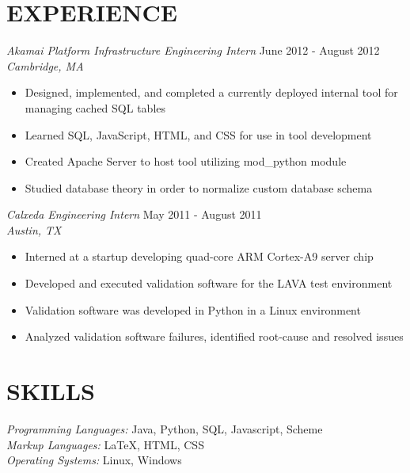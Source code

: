 \documentclass[margin]{res}
\begin{document}
\begin{resume}
                

\section{EXPERIENCE} {\sl Akamai Platform Infrastructure Engineering Intern} \hfill June 2012 -  August 2012 \\
                    {\sl Cambridge, MA}
                 \begin{itemize}  \itemsep -2pt %
                         \item  Designed, implemented, and completed a currently deployed internal tool for managing cached SQL tables
                         \item Learned SQL, JavaScript, HTML, and CSS for use in tool development
                         \item Created Apache Server to host tool utilizing mod\_python module 
                         \item Studied database theory in order to normalize custom database schema
                \end{itemize}

                {\sl Calxeda Engineering Intern} \hfill            May 2011 - August 2011 \\
                {\sl Austin, TX}
                 \begin{itemize}  \itemsep -2pt %
                                \item  Interned at a startup developing quad-core ARM Cortex-A9 server chip
                                \item Developed and executed validation software for the LAVA test environment
                                \item Validation software was developed in Python in a Linux environment
                                \item Analyzed validation software failures, identified root-cause and resolved issues
                 \end{itemize} 
 
\section{SKILLS} {\sl Programming Languages:} Java, Python, SQL, Javascript, Scheme
                 \\
                 {\sl Markup Languages:} \LaTeX, HTML, CSS \\
                {\sl Operating Systems:} Linux, Windows
 

\end{resume}
\end{document}
